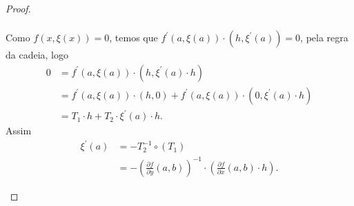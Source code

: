 \begin{proof}
\begin{itemize}
\begin{align*}
      \end{align*}
      Como $f(x,\xi(x))=0$, temos que $f^{\prime}(a,\xi(a))\cdot(h,\xi^{\prime}(a))=0$, pela regra da cadeia, logo
      \begin{align*}
        0&=f^{\prime}(a,\xi(a))\cdot(h,\xi^{\prime}(a)\cdot h)\\
        &=f^{\prime}(a,\xi(a))\cdot(h,0)+f^{\prime}(a,\xi(a))\cdot(0,\xi^{\prime}(a)\cdot h)\\
        &=T_1\cdot h+T_2\cdot\xi^{\prime}(a)\cdot h.
      \end{align*}
      Assim
      \begin{align*}
        \xi^{\prime}(a)&=-T_2^{-1}\circ(T_1)\\
        &=-\left( \frac{\partial f}{\partial y}(a,b) \right)^{-1}\cdot\left( \frac{\partial f}{\partial x}(a,b)\cdot h \right).
      \end{align*}
  \end{itemize}
\end{proof}
